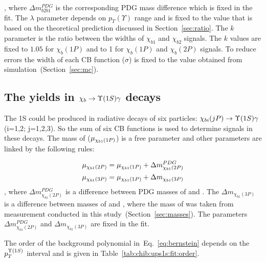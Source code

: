 , where $\Delta m_{b2b1}^{PDG}$ is the corresponding PDG mass difference which
is fixed in the fit. The $\lambda$ parameter depends on $p_T(\Upsilon)$ range
and is fixed to the value that is based on the theoretical prediction discussed
in Section~\ref{sec:ratio}. The $k$ parameter is the ratio between the widths of
$\chi_{b1}$ and $\chi_{b2}$ signals. The $k$ values are fixed to $1.05$ for
$\chi_b(1P)$  and to 1 for $\chi_b(1P)$ and $\chi_b(2P)$ signals. To reduce
errors the width of each CB function ($\sigma$) is fixed to the value obtained
from simulation~(Section~\ref{sec:mc}).

\subsection{The \texorpdfstring{\chib}{xb} yields in
	\texorpdfstring{$\chib \to \Y1S \gamma$}{chib -> Y(1S) gamma} decays}
\label{sec:chib:ups1s:fit}

The \Y1S could be produced in radiative decays of six \chib particles:
$\chi_{bi}(jP) \to \Y1S \gamma$ (i=1,2; j=1,2,3). So the sum of six CB functions
is used to determine \chib signals in these decays. The mass of \chiboneOneP
($\mu_{\chi_{b 1}(1P)}$) is a free parameter and  other parameters are linked by
the following rules:

\begin{equation}
  \begin{aligned}
\mu_{\chi_{b 1}(2P)} = \mu_{\chi_{b 1}(1P)} + \Delta m_{\chi_{b1}(2P)}^{PDG} \\
\mu_{\chi_{b 1}(3P)} = \mu_{\chi_{b 1}(1P)} + \Delta m_{\chi_{b1}(3P)} \\
  \end{aligned}
\end{equation}
, where $\Delta m_{\chi_{b1}(2P)}^{PDG}$ is a difference between PDG masses of
\chiboneTwoP and \chiboneOneP. The $\Delta  m_{\chi_{b1}(3P)}$ is a difference
between masses of \chiboneThreeP and \chiboneOneP, where the mass of
\chiboneThreeP was taken from measurement conducted in this
study~(Section~\ref{sec:masses}). The parameters  $\Delta
m_{\chi_{b1}(2P)}^{PDG}$ and $\Delta  m_{\chi_{b1}(3P)}$ are fixed  in the fit.

The order of the background polynomial in~Eq.~\ref{eq:bernstein} depends on the
$p_{T}^{\OneS}$ interval and is given in Table~\ref{tab:chib:ups1s:fit:order}.



